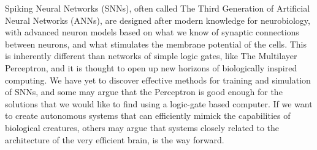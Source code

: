 Spiking Neural Networks (SNNs), often called The Third Generation of Artificial Neural Networks (ANNs), are designed after modern knowledge for neurobiology,
with advanced neuron models based on what we know of synaptic connections between neurons, and what stimulates the membrane potential of the cells.
This is inherently different than networks of simple logic gates, like The Multilayer Perceptron, and it is thought to open up new horizons of biologically inspired computing.
We have yet to discover effective methods for training and simulation of SNNs, and some may argue that the Perceptron is good enough for the solutions that we would like to find using a logic-gate based computer.
If we want to create autonomous systems that can efficiently mimick the capabilities of biological creatures, others may argue that systems closely related to the architecture of the very efficient brain, is the way forward.


